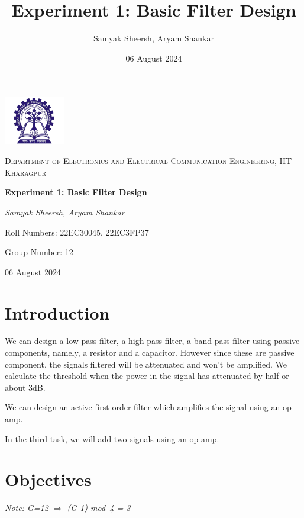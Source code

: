 \documentclass{article}
\title{Experiment 1: Basic Filter Design}
\author{Samyak Sheersh, Aryam Shankar}
\date{06 August 2024}
\begin{document}
\begin{titlepage}
    \centering
    \includegraphics[width=0.2\textwidth]{KGP_logo.png}\par\vspace{1cm}
    {\scshape\LARGE Department of Electronics and Electrical Communication Engineering, IIT Kharagpur\par}
    \vspace{1cm}
    {\huge\bfseries Experiment 1: Basic Filter Design\par}
    \vspace{1.5cm}
    {\Large\itshape Samyak Sheersh, Aryam Shankar\par}
    \vfill
    {\large Roll Numbers: 22EC30045, 22EC3FP37\par}
    {\large Group Number: 12\par}
    \vfill
    {\large 06 August 2024\par}
\end{titlepage}

\section{Introduction}
We can design a low pass filter, a high pass filter, a band pass filter using passive components, namely, a resistor and a capacitor. However since these are passive component, the signals filtered will be attenuated and won't be amplified. We calculate the threshold when the power in the signal has attenuated by half or about 3dB. 

We can design an active first order filter which amplifies the signal using an op-amp.

In the third task, we will add two signals using an op-amp.

\section{Objectives}

\emph{Note: G=12 $\Rightarrow$ (G-1) mod\ 4 = 3}
\end{document}
